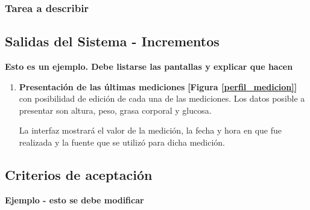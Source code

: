 \documentclass[a4paper,12pt]{article}
\begin{document}
	{\scriptsize
	\begin{center} %
	\centering
    	\end{center}
	}
  
 
  
\subsubsection{Tarea a describir}


\subsection {Salidas del Sistema - Incrementos}
\textbf{Esto es un ejemplo. Debe listarse las pantallas y explicar que hacen}
\begin{enumerate}
    \item \textbf{Presentación de las últimas mediciones}  \textbf{[Figura  \ref{perfil_medicion}]} con posibilidad de edición de cada una de las mediciones. Los datos posible  a presentar son altura, peso, grasa corporal y glucosa. 
    
    La interfaz mostrará el valor de la medición, la fecha y hora en que fue realizada y la fuente que se utilizó para dicha medición.

\end{enumerate}

    




\subsection{Criterios de aceptación}
\textbf{Ejemplo - esto se debe modificar}
\end{document}
